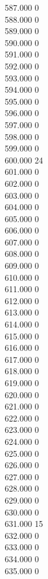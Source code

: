 { 587.000	0 \\
 588.000	0 \\
 589.000	0 \\
 590.000	0 \\
 591.000	0 \\
 592.000	0 \\
 593.000	0 \\
 594.000	0 \\
 595.000	0 \\
 596.000	0 \\
 597.000	0 \\
 598.000	0 \\
 599.000	0 \\
 600.000	24 \\
 601.000	0 \\
 602.000	0 \\
 603.000	0 \\
 604.000	0 \\
 605.000	0 \\
 606.000	0 \\
 607.000	0 \\
 608.000	0 \\
 609.000	0 \\
 610.000	0 \\
 611.000	0 \\
 612.000	0 \\
 613.000	0 \\
 614.000	0 \\
 615.000	0 \\
 616.000	0 \\
 617.000	0 \\
 618.000	0 \\
 619.000	0 \\
 620.000	0 \\
 621.000	0 \\
 622.000	0 \\
 623.000	0 \\
 624.000	0 \\
 625.000	0 \\
 626.000	0 \\
 627.000	0 \\
 628.000	0 \\
 629.000	0 \\
 630.000	0 \\
 631.000	15 \\
 632.000	0 \\
 633.000	0 \\
 634.000	0 \\
 635.000	0 \\
}
